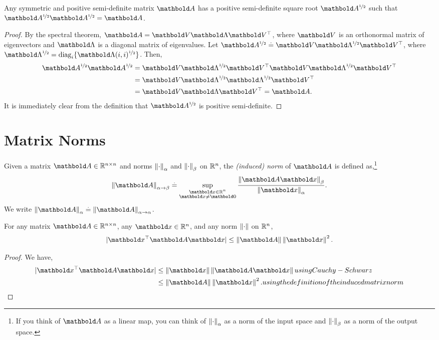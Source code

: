 \begin{lem}
Any symmetric and positive semi-definite matrix $\mA$ has a positive semi-definite square root $\mA^{\nicefrac{1}{2}}$ such that $\mA^{\nicefrac{1}{2}} \mA^{\nicefrac{1}{2}} = \mA$.
\end{lem}
\begin{proof} By the spectral theorem, $\mA = \mV\mLambda\trans{\mV}$, where $\mV$ is an orthonormal matrix of eigenvectors and $\mLambda$ is a diagonal matrix of eigenvalues. Let $\mA^{\nicefrac{1}{2}} \defeq \mV\mLambda^{\nicefrac{1}{2}}\trans{\mV}$, where $\mLambda^{\nicefrac{1}{2}} = \diag_i\{\mLambda(i,i)^{\nicefrac{1}{2}}\}$. Then, \begin{align*}
    \mA^{\nicefrac{1}{2}} \mA^{\nicefrac{1}{2}} &= \mV \mLambda^{\nicefrac{1}{2}} \trans{\mV} \mV \mLambda^{\nicefrac{1}{2}} \trans{\mV} \\
    &= \mV \mLambda^{\nicefrac{1}{2}} \mLambda^{\nicefrac{1}{2}} \trans{\mV} \\
    &= \mV \mLambda \trans{\mV} = \mA.
\end{align*} It is immediately clear from the definition that $\mA^{\nicefrac{1}{2}}$ is positive semi-definite.
\end{proof}

\section{Matrix Norms}

\begin{defn} Given a matrix $\mA \in \R^{n \times n}$ and norms $\left\| \cdot \right\|_\alpha$ and $\left\| \cdot \right\|_\beta$ on $\mathbb{R}^n$, the \emph{(induced) norm} of $\mA$ is defined as,\footnote{If you think of $\mA$ as a linear map, you can think of $\left\| \cdot \right\|_\alpha$ as a norm of the input space and $\left\| \cdot \right\|_\beta$ as a norm of the output space.} \begin{align}
    \norm{\mA}_{\alpha\to\beta} \defeq \sup_{\substack{\vx \in \R^n \\ \vx \neq \vZero}} \frac{\norm{\mA\vx}_\beta}{\norm{\vx}_\alpha}.
\end{align} We write $\norm{\mA}_\alpha \defeq \norm{\mA}_{\alpha\to\alpha}$.
\end{defn}

\begin{lem} For any matrix $\mA \in \R^{n \times n}$, any $\vx \in \R^n$, and any norm $\left\| \cdot \right\|$ on $\mathbb{R}^n$, \begin{align}
    |\trans{\vx}\mA\vx| \leq \norm{\mA}\norm{\vx}^2. \label{eq:quadratic_form_bound}
\end{align}
\end{lem}
\begin{proof} We have, \begin{align*}
    |\trans{\vx}\mA\vx| &\leq \norm{\vx} \norm{\mA\vx} \margintag{using Cauchy-Schwarz} \\
    &\leq \norm{\mA} \norm{\vx}^2. \margintag{using the definition of the induced matrix norm} \qedhere
\end{align*}
\end{proof}

